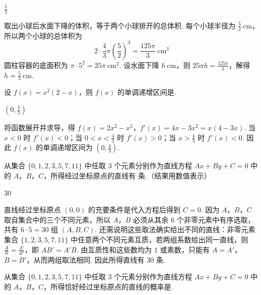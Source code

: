 \documentclass[UTF8,a4paper,oneside,11pt]{ctexbook}
\begin{document}
\begin{answer}
\(\frac{5}{3}\)
\end{answer}

\begin{solution}
取出小球后水面下降的体积，等于两个小球排开的总体积. 每个小球半径为 \(\frac52\mathrm{~cm}\)，所以两个小球的总体积为
\[
2\cdot\frac43\pi\left(\frac52\right)^3=\frac{125\pi}{3}\ \mathrm{cm}^3
\]
圆柱容器的底面积为 \(\pi\cdot5^2=25\pi\ \mathrm{cm}^2\). 设水面下降 \(h\ \mathrm{cm}\)，则 \(25\pi h=\frac{125\pi}{3}\)，解得 \(h=\frac53\ \mathrm{cm}\).
\end{solution}

\reuseproblemnumber
\begin{problem}[B]
设 \(f(x)=x^{2}(2-x)\)，则 \(f(x)\) 的单调递增区间是\fillinblank{}.
\end{problem}

\begin{answer}
\(\left(0,\frac{4}{3}\right)\)
\end{answer}

\begin{solution}
将函数展开并求导，得 \(f(x)=2x^2-x^3\)，\(f'(x)=4x-3x^2=x(4-3x)\). 当 \(x<0\) 时 \(f'(x)<0\)；当 \(0<x<\frac43\) 时 \(f'(x)>0\)；当 \(x>\frac43\) 时 \(f'(x)<0\). 因此 \(f(x)\) 的单调递增区间为 \(\left(0,\frac43\right)\).
\end{solution}

\begin{problem}[A]
从集合 \(\{0,1,2,3,5,7,11\}\) 中任取 \(3\) 个元素分别作为直线方程 \(Ax + By + C = 0\) 中的 \(A\)，\(B\)，\(C\)，所得经过坐标原点的直线有\fillinblank{} 条.（结果用数值表示）
\end{problem}

\begin{answer}
30
\end{answer}

\begin{solution}
直线经过坐标原点 \((0,0)\) 的充要条件是代入方程后得到 \(C=0\). 因为 \(A\)，\(B\)，\(C\) 取自集合中的三个不同元素，所以 \(A\)，\(B\) 必须从其余 \(6\) 个非零元素中有序选取，共有 \(6\cdot5=30\) 组 \((A,B,C)\). 还需说明这些取法确实给出不同的直线：非零元素集合 \(\{1,2,3,5,7,11\}\) 中任意两个不同元素互质，若两组系数给出同一直线，则 \(\frac{A}{B}=\frac{A'}{B'}\)，即 \(AB'=A'B\). 由互质性和这些数均为 \(1\) 或素数，只能有 \(A=A'\)，\(B=B'\)，从而两组取法相同. 因此所得直线有 \(30\) 条.
\end{solution}

\reuseproblemnumber
\begin{problem}[B]
从集合 \(\{0,1,2,3,5,7,11\}\) 中任取 \(3\) 个元素分别作为直线方程 \(Ax + By + C = 0\) 中的 \(A\)，\(B\)，\(C\)，所得恰好经过坐标原点的直线的概率是\fillinblank{}.
\end{problem}
\end{document}
